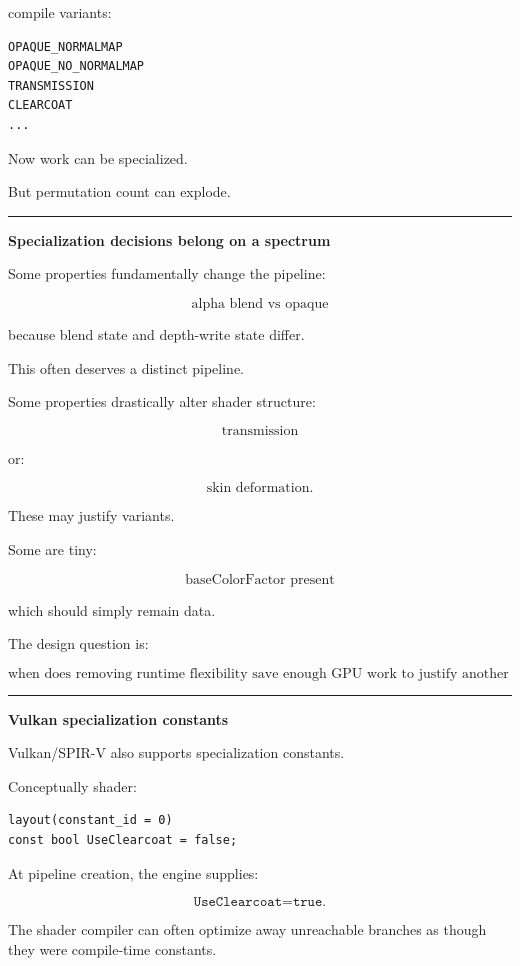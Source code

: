 compile variants:

\begin{verbatim}
OPAQUE_NORMALMAP
OPAQUE_NO_NORMALMAP
TRANSMISSION
CLEARCOAT
...
\end{verbatim}

Now work can be specialized.

But permutation count can explode.

\begin{center}\rule{0.5\linewidth}{0.5pt}\end{center}

\textbf{Specialization decisions belong on a spectrum}

Some properties fundamentally change the pipeline:

\[
\text{alpha blend vs opaque}
\]

because blend state and depth-write state differ.

This often deserves a distinct pipeline.

Some properties drastically alter shader structure:

\[
\text{transmission}
\]

or:

\[
\text{skin deformation}.
\]

These may justify variants.

Some are tiny:

\[
\text{baseColorFactor present}
\]

which should simply remain data.

The design question is:

\[
\boxed{
\text{when does removing runtime flexibility save enough GPU work to justify another compiled variant?}
}
\]

\begin{center}\rule{0.5\linewidth}{0.5pt}\end{center}

\textbf{Vulkan specialization constants}

Vulkan/SPIR-V also supports specialization constants.

Conceptually shader:

\begin{verbatim}
layout(constant_id = 0)
const bool UseClearcoat = false;
\end{verbatim}

At pipeline creation, the engine supplies:

\[
\texttt{UseClearcoat=true}.
\]

The shader compiler can often optimize away unreachable branches as though they were compile-time constants.


